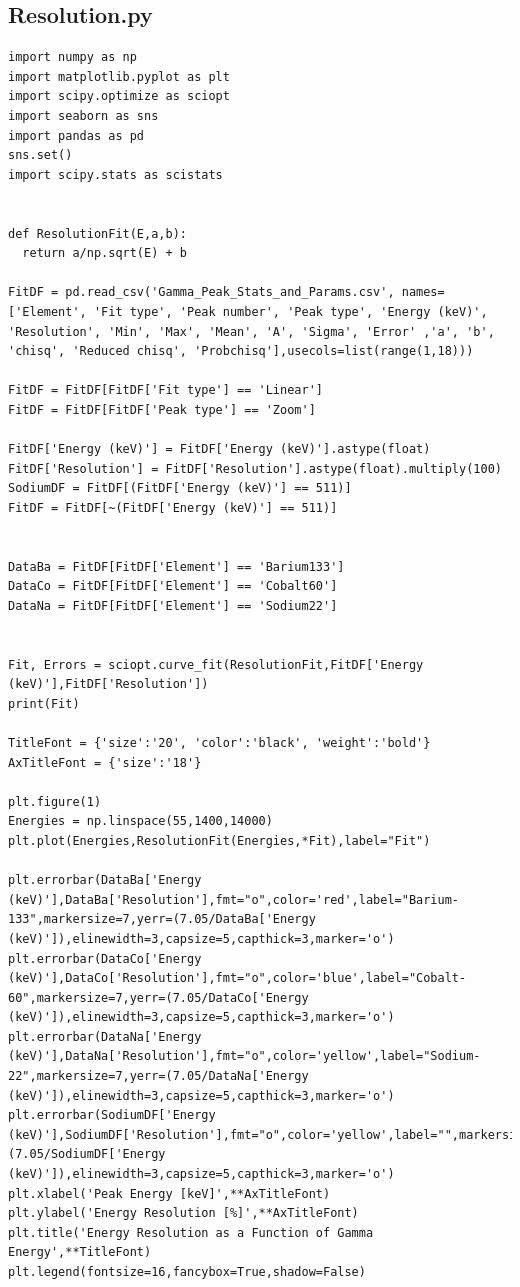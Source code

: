 \documentclass[11pt,a4paper]{article}
\begin{document}
\subsection{Resolution.py}
\begin{verbatim}
import numpy as np
import matplotlib.pyplot as plt
import scipy.optimize as sciopt
import seaborn as sns
import pandas as pd
sns.set()
import scipy.stats as scistats


def ResolutionFit(E,a,b):
  return a/np.sqrt(E) + b

FitDF = pd.read_csv('Gamma_Peak_Stats_and_Params.csv', names=['Element', 'Fit type', 'Peak number',	'Peak type', 'Energy (keV)', 'Resolution', 'Min', 'Max', 'Mean', 'A', 'Sigma', 'Error' ,'a', 'b', 'chisq', 'Reduced chisq', 'Probchisq'],usecols=list(range(1,18)))

FitDF = FitDF[FitDF['Fit type'] == 'Linear']
FitDF = FitDF[FitDF['Peak type'] == 'Zoom']

FitDF['Energy (keV)'] = FitDF['Energy (keV)'].astype(float)
FitDF['Resolution'] = FitDF['Resolution'].astype(float).multiply(100)
SodiumDF = FitDF[(FitDF['Energy (keV)'] == 511)]
FitDF = FitDF[~(FitDF['Energy (keV)'] == 511)]


DataBa = FitDF[FitDF['Element'] == 'Barium133']
DataCo = FitDF[FitDF['Element'] == 'Cobalt60']
DataNa = FitDF[FitDF['Element'] == 'Sodium22']


Fit, Errors = sciopt.curve_fit(ResolutionFit,FitDF['Energy (keV)'],FitDF['Resolution'])
print(Fit)

TitleFont = {'size':'20', 'color':'black', 'weight':'bold'} 
AxTitleFont = {'size':'18'}

plt.figure(1)
Energies = np.linspace(55,1400,14000)
plt.plot(Energies,ResolutionFit(Energies,*Fit),label="Fit")

plt.errorbar(DataBa['Energy (keV)'],DataBa['Resolution'],fmt="o",color='red',label="Barium-133",markersize=7,yerr=(7.05/DataBa['Energy (keV)']),elinewidth=3,capsize=5,capthick=3,marker='o')
plt.errorbar(DataCo['Energy (keV)'],DataCo['Resolution'],fmt="o",color='blue',label="Cobalt-60",markersize=7,yerr=(7.05/DataCo['Energy (keV)']),elinewidth=3,capsize=5,capthick=3,marker='o')
plt.errorbar(DataNa['Energy (keV)'],DataNa['Resolution'],fmt="o",color='yellow',label="Sodium-22",markersize=7,yerr=(7.05/DataNa['Energy (keV)']),elinewidth=3,capsize=5,capthick=3,marker='o')
plt.errorbar(SodiumDF['Energy (keV)'],SodiumDF['Resolution'],fmt="o",color='yellow',label="",markersize=7,yerr=(7.05/SodiumDF['Energy (keV)']),elinewidth=3,capsize=5,capthick=3,marker='o')
plt.xlabel('Peak Energy [keV]',**AxTitleFont)
plt.ylabel('Energy Resolution [%]',**AxTitleFont)
plt.title('Energy Resolution as a Function of Gamma Energy',**TitleFont)
plt.legend(fontsize=16,fancybox=True,shadow=False)


\end{verbatim}
\end{document}
